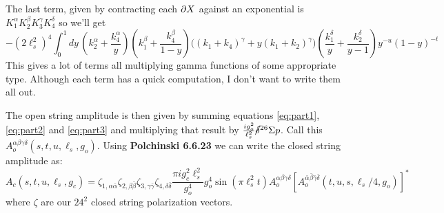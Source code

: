 \documentclass[11pt, class=article, crop=false]{standalone}
\begin{document}
\begin{enumerate}
	The last term, given by contracting each $\partial X$ against an exponential is $K_1^\alpha K_2^\beta K_3^\gamma K_4^\delta$ so we'll get
	\begin{equation}\label{eq:part3}
		-(2\ell_s^2)^4 \int_0^1 dy \, \left(k_2^\alpha + \frac{k_4^\alpha}{y} \right) \left(k_1^\beta + \frac{k_4^\beta}{1-y} \right) \Big(  (k_1+k_4)^\gamma + y (k_1+k_2)^\gamma \Big) \left(\frac{k_1^\delta}{y} +\frac{k_2^\delta}{y-1} \right) y^{-u} (1-y)^{-t}  
	\end{equation}
	This gives a lot of terms all multiplying gamma functions of some appropriate type. Although each term has a quick computation, I don't want to write them all out.
	
	The open string amplitude is then given by summing equations \eqref{eq:part1}, \eqref{eq:part2} and \eqref{eq:part3} and multiplying that result by $\frac{i g_o^2}{\ell_s^2} \cancel\delta^{26}{\Sigma p}$. Call this $A^{\alpha \beta \gamma \delta}_o(s,t,u, \ell_s, g_o)$. Using \textbf{Polchinski 6.6.23} we can write the closed string amplitude as:
	\[
		A_c(s,t,u,\ell_s, g_c) = \zeta_{1, \alpha \bar \alpha} \zeta_{2, \beta \bar \beta} \zeta_{3, \gamma \bar \gamma} \zeta_{4, \delta \bar \delta} 
		\frac{\pi i g_c^2 \ell_s^2}{g_o^4}{g_o^4} 
		\sin(\pi \ell_s^2 t) 
		A_o^{\alpha \beta \gamma \delta} 
		[A_o^{\bar \alpha \bar \beta \bar \gamma \bar \delta}(t, u, s, \ell_s/4, g_o)]^*
	\]
	where $\zeta$ are our $24^2$ closed string polarization vectors. 
	

\end{enumerate}
\end{document}
